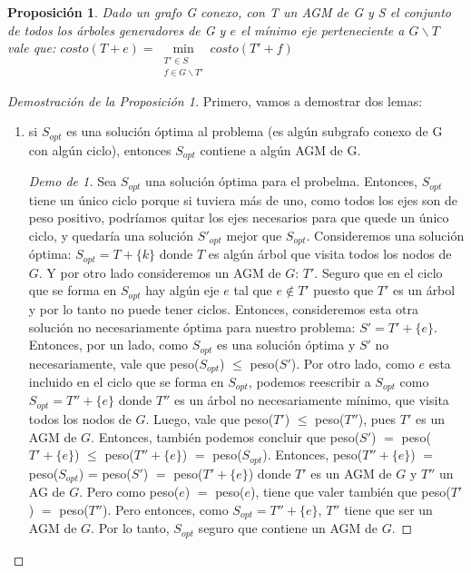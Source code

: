 \documentclass[11pt, a4paper, twoside]{article}
\begin{document}
\newtheorem{prop}{Proposición}
\begin{prop}
Dado un grafo G conexo, con T un AGM de G y S el conjunto de todos los árboles
generadores de G y $e$ el mínimo eje perteneciente a $G \backslash T$ vale que: 
$costo(T+e) = \min\limits_{\substack{T' \in S \\ f \in G \backslash T'}} costo(T'+f)$
\end{prop}
\begin{proof}[Demostración de la Proposición 1] 
Primero, vamos a demostrar dos lemas: 
\begin{enumerate}
  \item si $S_{opt}$ es una solución óptima al problema (es algún subgrafo conexo  de G
		con algún ciclo), entonces $S_{opt}$ contiene a algún AGM de G.
		
		\begin{proof}[Demo de 1]
		Sea $S_{opt}$ una solución óptima para el probelma. Entonces, $S_{opt}$ tiene un único ciclo
		porque si tuviera más de uno, como todos los ejes son de peso positivo, podríamos quitar
		los ejes necesarios para que quede un único ciclo, y quedaría una solución $S'_{opt}$ mejor que $S_{opt}$.
		Consideremos una solución óptima: $S_{opt} = T + \{k\}$ donde $T$ es algún árbol que visita 
		todos los nodos de $G$. Y por otro lado consideremos un AGM de $G$: $T'$. Seguro que en el ciclo
		que se forma en $S_{opt}$ hay algún eje $e$ tal que $e \not\in T'$ puesto que $T'$ es un árbol y 
		por lo tanto no puede tener ciclos. Entonces, consideremos esta otra solución no necesariamente 
		óptima para nuestro problema: $S' = T' + \{e\}$. Entonces, por un lado, como $S_{opt}$ es una solución
		óptima y $S'$ no necesariamente, vale que peso($S_{opt}$) $\leq$ peso($S'$). Por otro lado, como $e$
		esta incluido en el ciclo que se forma en $S_{opt}$, podemos reescribir a $S_{opt}$ como 
		$S_{opt} = T'' + \{e\}$ donde $T''$ es un árbol no necesariamente mínimo, que visita todos los nodos
		de $G$. Luego, vale que peso($T'$) $\leq$ peso($T''$), pues $T'$ es un AGM de $G$. Entonces, también
		podemos concluir que peso($S'$) $=$ peso($T' + \{e\}$) $\leq$ peso($T''+\{e\}$) $=$ peso($S_{opt}$).
		Entonces, peso($T'' + \{e\}$) $=$ peso($S_{opt}$) = peso($S'$) $=$ peso($ T' + \{e\}$) donde $T'$ es un
		AGM de $G$ y $T''$ un AG de $G$. Pero como peso($e$) $=$ peso($e$), tiene que valer también que
		peso($T'$) $=$ peso($T''$). Pero entonces, como $S_{opt} = T'' + \{e\}$, $T''$ tiene que ser un AGM de
		$G$. Por lo tanto, $S_{opt}$ seguro que contiene un AGM de $G$.
		\end{proof}
  

\end{enumerate}
\end{proof}
\end{document}

